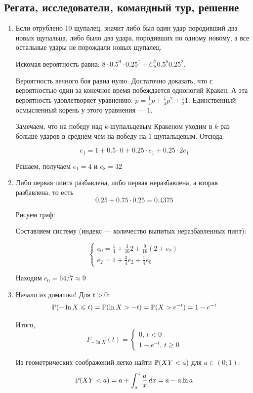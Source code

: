 \subsection{Регата, исследователи, командный тур, решение}

\begin{enumerate}

\item Если отрублено 10 щупалец, значит либо был один удар породивший два новых щупальца, либо было два удара, породивших по одному новому, а все остальные удары не порождали новых щупалец.

Искомая вероятность равна: $8\cdot 0.5^9 \cdot 0.25^1 + C_8^2 0.5^8 0.25^2$.

Вероятность вечного боя равна нулю. Достаточно доказать, что с вероятностью один за конечное время побеждается одноногий Кракен. А эта вероятность удовлетворяет уравнению: $p=\frac{1}{4}p + \frac{1}{4}p^2 + \frac{1}{2} 1$. Единственный осмысленный корень у этого уравнения — $1$.

Замечаем, что на победу над $k$-шупальцевым Кракеном уходим в $k$ раз больше ударов в среднем чем на победу на $1$-щупальцевым. Отсюда:

\[
e_1=1 + 0.5\cdot 0 + 0.25\cdot e_1 + 0.25 \cdot 2e_1
\]

Решаем, получаем $e_1=4$ и $e_8=32$

\item Либо первая пинта разбавлена, либо первая неразбавлена, а вторая разбавлена, то есть
\[
0.25 + 0.75\cdot 0.25 =0.4375
\]

Рисуем граф:


Составляем систему (индекс — количество выпитых неразбавленных пинт):

\[
\begin{cases}
e_0=\frac{1}{4} + \frac{3}{16}2 + \frac{9}{16}(2+e_2) \\
e_2=1+\frac{3}{4}e_2 + \frac{1}{4}e_0
\end{cases}
\]

Находим $e_0=64/7\approx 9$

\item Начало из домашки! Для $t>0$:
\[
\P(-\ln X \leq t)=\P(\ln X > -t)=\P(X > e^{-t})=1-e^{-t}
\]

Итого,
\[
F_{-\ln X}(t)=\begin{cases}
0, \, t < 0 \\
1-e^{-t}, \, t \geq 0
\end{cases}
\]

Из геометрических соображений легко найти $\P(XY < a)$ для $a\in (0;1)$:
\[
\P(XY < a)=a + \int_a^1 \frac{a}{x} \, dx=a-a\ln a
\]


\end{enumerate}
